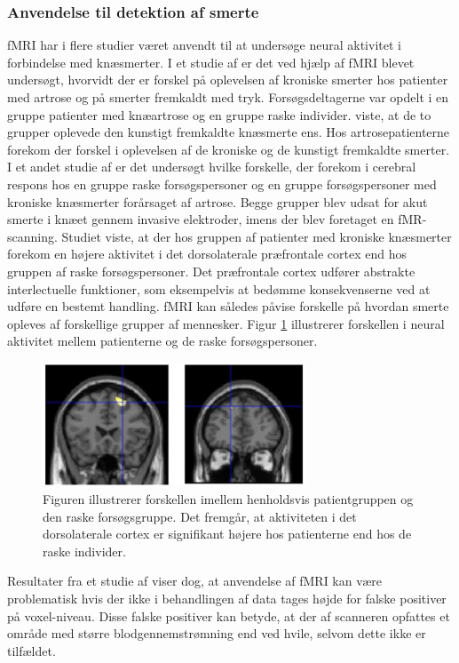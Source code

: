 \subsubsection{Anvendelse til detektion af smerte}
fMRI har i flere studier været anvendt til at undersøge neural aktivitet i forbindelse med knæsmerter.
I et studie af  er det ved hjælp af fMRI blevet undersøgt, hvorvidt der er forskel på oplevelsen af kroniske smerter hos patienter med artrose og på smerter fremkaldt med tryk. Forsøgsdeltagerne var opdelt i en gruppe patienter med knæartrose og en gruppe raske individer.  viste, at de to grupper oplevede den kunstigt fremkaldte knæsmerte ens. Hos artrosepatienterne forekom der forskel i oplevelsen af de kroniske og de kunstigt fremkaldte smerter. \citep{Parks2012}\\ 
I et andet studie af  er det undersøgt hvilke forskelle, der forekom i cerebral respons hos en gruppe raske forsøgspersoner og en gruppe forsøgspersoner med kroniske knæsmerter forårsaget af artrose. Begge grupper blev udsat for akut smerte i knæet gennem invasive elektroder, imens der blev foretaget en fMR-scanning. Studiet viste, at der hos gruppen af patienter med kroniske knæsmerter forekom en højere aktivitet i det dorsolaterale præfrontale cortex end hos gruppen af raske forsøgspersoner. \citep{Hiramatsu2014} Det præfrontale cortex udfører abstrakte interlectuelle funktioner, som eksempelvis at bedømme konsekvenserne ved at udføre en bestemt handling. \citep{Martini}
fMRI kan således påvise forskelle på hvordan smerte opleves af forskellige grupper af mennesker. Figur \ref{fig:fMRI_result} illustrerer forskellen i neural aktivitet mellem patienterne og de raske forsøgspersoner.
\begin{figure}[H] 
	\begin{center}
		\includegraphics[width=0.7\textwidth]{figures/bProblemanalyse/fMRI_dorsolateral}
	\end{center}
	\caption{Figuren illustrerer forskellen imellem henholdsvis patientgruppen og den raske forsøgsgruppe. Det fremgår, at aktiviteten i det dorsolaterale cortex er signifikant højere hos patienterne end hos de raske individer. \citep{Hiramatsu2014}} 
	\label{fig:fMRI_result} 
\end{figure} 
Resultater fra et studie af  viser dog, at anvendelse af fMRI kan være problematisk hvis der ikke i behandlingen af data tages højde for falske positiver på voxel-niveau. Disse falske positiver kan betyde, at der af scanneren opfattes et område med større blodgennemstrømning end ved hvile, selvom dette ikke er tilfældet. \citep{Bennet2011} 

